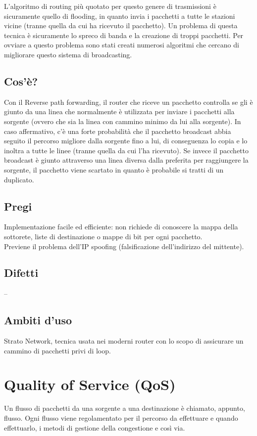 L'algoritmo di routing più quotato per questo genere di trasmissioni è sicuramente quello di flooding, in quanto invia i pacchetti a tutte le stazioni vicine (tranne quella da cui ha ricevuto il pacchetto). Un problema di questa tecnica è sicuramente lo spreco di banda e la creazione di troppi pacchetti.
Per ovviare a questo problema sono stati creati numerosi algoritmi che cercano di migliorare questo sistema di broadcasting.

\subsection{Cos'è?}
Con il Reverse path forwarding, il router che riceve un pacchetto controlla se gli è giunto da una linea che normalmente è utilizzata per inviare i pacchetti alla sorgente (ovvero che sia la linea con cammino minimo da lui alla sorgente). In caso affermativo, c'è una forte probabilità che il pacchetto broadcast abbia seguito il percorso migliore dalla sorgente fino a lui, di conseguenza lo copia e lo inoltra a tutte le linee (tranne quella da cui l'ha ricevuto). Se invece il pacchetto broadcast è giunto attraverso una linea diversa dalla preferita per raggiungere la sorgente, il pacchetto viene scartato in quanto è probabile si tratti di un duplicato.


\subsection{Pregi}
Implementazione facile ed efficiente: non richiede di conoscere la mappa della sottorete, liste di destinazione o mappe di bit per ogni pacchetto.\\
Previene il problema dell'IP spoofing (falsificazione dell'indirizzo del mittente).
\subsection{Difetti}
--
\subsection{Ambiti d'uso}
Strato Network, tecnica usata nei moderni router con lo scopo di assicurare un cammino di pacchetti privi di loop.

\section{Quality of Service (QoS)}

Un flusso di pacchetti da una sorgente a una destinazione è chiamato, appunto, flusso.
Ogni flusso viene regolamentato per il percorso da effettuare e quando effettuarlo, i metodi di gestione della congestione e così via.

